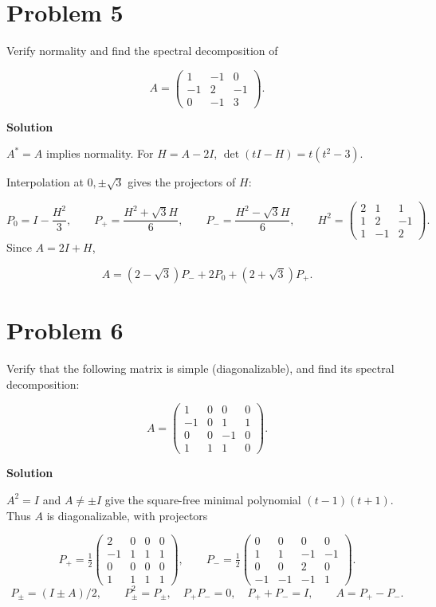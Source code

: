 \documentclass[UTF8,10pt,letterpaper,fontset=fandol]{ctexart}
\begin{document}
\section{Problem 5}
Verify normality and find the spectral decomposition of\par
\[
 A=\begin{pmatrix}1&-1&0\\-1&2&-1\\0&-1&3\end{pmatrix}.
\]
\par{}\textbf{Solution}\par
$A^*=A$ implies normality. For $H=A-2I$, $\det(tI-H)=t(t^2-3)$.\par
Interpolation at $0,\pm\sqrt3$ gives the projectors of $H$:\par
\[
 P_0=I-\frac{H^2}{3},\qquad
 P_+=\frac{H^2+\sqrt3 H}{6},\qquad P_-=\frac{H^2-\sqrt3 H}{6},
 \qquad H^2=\begin{pmatrix}2&1&1\\1&2&-1\\1&-1&2\end{pmatrix}.
\]
Since $A=2I+H$,\par
\[\boxed{A=(2-\sqrt3)P_-+2P_0+(2+\sqrt3)P_+}.\]
\section{Problem 6}
Verify that the following matrix is simple (diagonalizable), and find its spectral decomposition:\par
\[
 A=\begin{pmatrix}1&0&0&0\\-1&0&1&1\\0&0&-1&0\\1&1&1&0\end{pmatrix}.
\]
\par{}\textbf{Solution}\par
$A^2=I$ and $A\ne\pm I$ give the square-free minimal polynomial $(t-1)(t+1)$. Thus $A$ is diagonalizable, with projectors\par
\[
 P_+=\tfrac12\begin{pmatrix}2&0&0&0\\-1&1&1&1\\0&0&0&0\\1&1&1&1\end{pmatrix},\qquad
 P_-=\tfrac12\begin{pmatrix}0&0&0&0\\1&1&-1&-1\\0&0&2&0\\-1&-1&-1&1\end{pmatrix}.
\]
\[
 P_\pm=(I\pm A)/2,\qquad P_\pm^2=P_\pm,\quad P_+P_-=0,\quad
 P_++P_-=I,\qquad \boxed{A=P_+-P_-}.
\]
\end{document}
